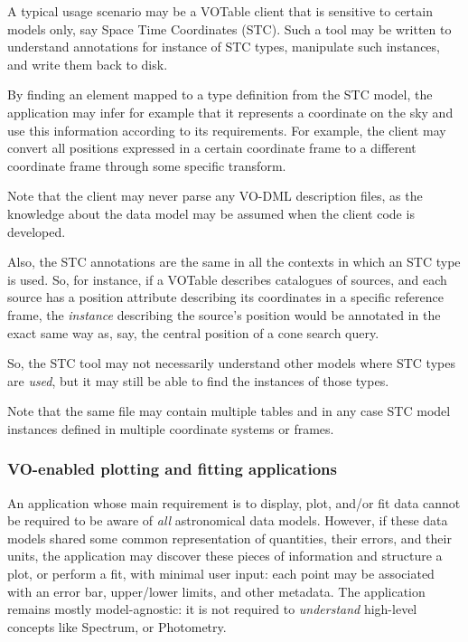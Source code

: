 \documentclass[11pt,a4paper]{ivoa}
\begin{document}
A typical usage scenario may be a VOTable client that is sensitive to
certain models only, say Space Time Coordinates (STC). Such a tool may
be written to understand annotations for instance of STC types,
manipulate such instances, and write them back to disk.

By finding an element mapped to a type definition from the STC model,
the application may infer for example that it represents a coordinate on
the sky and use this information according to its requirements. For
example, the client may convert all positions expressed in a certain
coordinate frame to a different coordinate frame through some specific
transform.

Note that the client may never parse any VO-DML description files, as
the knowledge about the data model may be assumed when the client code
is developed.

Also, the STC annotations are the same in all the contexts in which an
STC type is used. So, for instance, if a VOTable describes catalogues of
sources, and each source has a position attribute describing its
coordinates in a specific reference frame, the \emph{instance}
describing the source's position would be annotated in the exact same
way as, say, the central position of a cone search query.

So, the STC tool may not necessarily understand other models where STC
types are \emph{used}, but it may still be able to find the instances of
those types.

Note that the same file may contain multiple tables and in any case STC
model instances defined in multiple coordinate systems or frames.

\subsubsection{VO-enabled plotting and fitting
applications}\label{vo-enabled-plotting-and-fitting-applications}

An application whose main requirement is to display, plot, and/or fit
data cannot be required to be aware of \emph{all} astronomical data
models. However, if these data models shared some common representation
of quantities, their errors, and their units, the application may
discover these pieces of information and structure a plot, or perform a
fit, with minimal user input: each point may be associated with an error
bar, upper/lower limits, and other metadata. The application remains
mostly model-agnostic: it is not required to \emph{understand}
high-level concepts like Spectrum, or Photometry.
\end{document}

